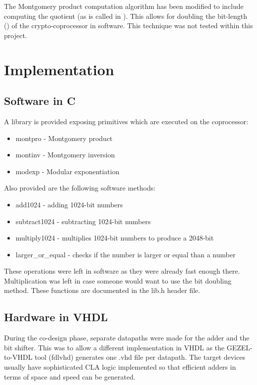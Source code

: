 \documentclass[a4paper, 12pt]{article}
\begin{document}
The Montgomery product computation algorithm has been modified to
include computing the quotient (as is called in
\cite{monpro_doubling}). This allows for doubling the bit-length
(\cite{monpro_doubling, classic_doubling}) of the crypto-coprocessor
in software. This technique was not tested within this project.

\section{Implementation}

\subsection{Software in C}

A library is provided exposing primitives which are executed on the
coprocessor:
\begin{itemize}
\item montpro - Montgomery product
\item montinv - Montgomery inversion
\item modexp - Modular exponentiation
\end{itemize}

\noindent
Also provided are the following software methods:
\begin{itemize}
\item add1024 - adding 1024-bit numbers
\item subtract1024 - subtracting 1024-bit numbers
\item multiply1024 - multiplies 1024-bit numbers to produce a 2048-bit
\item larger\_or\_equal - checks if the number is larger or equal than a number
\end{itemize}

These operations were left in software as they were already fast
enough there. Multiplication was left in case someone would want to
use the bit doubling method. These functions are documented in the
lib.h header file.

\subsection{Hardware in VHDL}

During the co-design phase, separate datapaths were made for the adder
and the bit shifter.  This was to allow a different implementation in
VHDL as the GEZEL-to-VHDL tool (fdlvhd) generates one .vhd file per
datapath. The target devices usually have sophisticated CLA logic
implemented so that efficient adders in terms of space and speed can
be generated.
\end{document}
